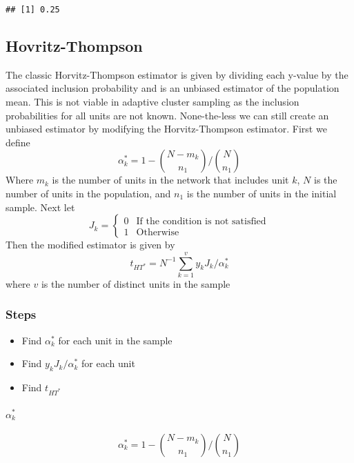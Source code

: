 \documentclass[
]{article}
\providecommand{\tightlist}{%
  \setlength{\itemsep}{0pt}\setlength{\parskip}{0pt}}
\begin{document}
\begin{verbatim}
## [1] 0.25
\end{verbatim}

\subsection{Hovritz-Thompson}\label{hovritz-thompson}

The classic Horvitz-Thompson estimator is given by dividing each y-value
by the associated inclusion probability and is an unbiased estimator of
the population mean. This is not viable in adaptive cluster sampling as
the inclusion probabilities for all units are not known. None-the-less
we can still create an unbiased estimator by modifying the
Horvitz-Thompson estimator. First we define
\[\alpha^*_k=1-{N-m_k\choose n_1}/{N\choose n_1}\] Where \(m_k\) is the
number of units in the network that includes unit \(k\), \(N\) is the
number of units in the population, and \(n_1\) is the number of units in
the initial sample. Next let
\[J_k=\begin{cases}0& \text{If the condition is not satisfied} \\ 1 & \text{Otherwise}\end{cases}\]
Then the modified estimator is given by
\[t_{{HT}^*}=N^{-1}\sum^v_{k=1}y_kJ_k/\alpha^*_k\] where \(v\) is the
number of distinct units in the sample

\subsubsection{Steps}\label{steps-1}

\begin{itemize}
\tightlist
\item
  Find \(\alpha^*_k\) for each unit in the sample
\item
  Find \(y_kJ_k/\alpha^*_k\) for each unit
\item
  Find \(t_{HT^*}\)
\end{itemize}

\paragraph{\texorpdfstring{\(\alpha^*_k\)}{\textbackslash alpha\^{}*\_k}}\label{alpha_k}

\[\alpha^*_k=1-{N-m_k\choose n_1}/{N\choose n_1}\]
\end{document}
